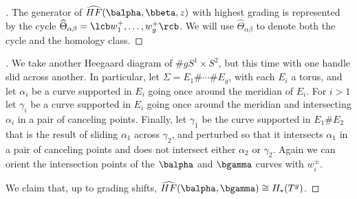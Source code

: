 \begin{example}
\begin{proof}[]
The generator of $\widehat{HF}(\balpha,\bbeta,z)$ with highest grading is represented by the cycle $\widehat{\Theta}_{\alpha\beta} = \lcb w_1^+,\ldots,w_g^+ \rcb$. We will use $\widehat{\Theta}_{\alpha\beta}$ to denote both the cycle and the homology class.
\end{proof}
\end{example}

\begin{example}
\label{standard model calculation for handle slide in S^1 x S^2}
\begin{proof}[]
We take another Heegaard diagram of $\# g S^1 \times S^2$, but this time with one handle slid across another. In particular, let $\Sigma = E_1 \# \cdots \# E_g$, with each $E_i$ a torus, and let $\alpha_i$ be a curve supported in $E_i$ going once around the meridian of $E_i$. For $i>1$ let $\gamma_i$ be a curve supported in $E_i$ going once around the meridian and intersecting $\alpha_i$ in a pair of canceling points. Finally, let $\gamma_1$ be the curve supported in $E_1 \# E_2$ that is the result of sliding $\alpha_1$ across $\gamma_2$, and perturbed so that it intersects $\alpha_1$ in a pair of canceling points and does not intersect either $\alpha_2$ or $\gamma_2$. Again we can orient the intersection points of the $\balpha$ and $\bgamma$ curves with $w_i^\pm$.

We claim that, up to grading shifts, $\widehat{HF}(\balpha,\bgamma) \cong H_*(T^g)$. 

\unfinished
\end{proof}
\end{example}

